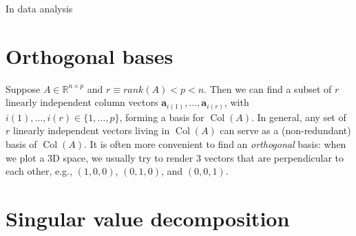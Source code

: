 \documentclass[
]{book}
\begin{document}
In data analysis

\section{Orthogonal bases}\label{orthogonal-bases}

Suppose \(A \in \mathbb{R}^{n \times p}\) and \(r \equiv rank(A) < p < n\). Then we can find a subset of \(r\) linearly independent column vectors \(\mathbf{a}_{i(1)}, \dots, \mathbf{a}_{i(r)}\), with \(i(1), \dots, i(r) \in \{1, \dots, p\}\), forming a basis for \(\operatorname{Col}(A)\). In general, any set of \(r\) linearly independent vectors living in \(\operatorname{Col}(A)\) can serve as a (non-redundant) basis of \(\operatorname{Col}(A)\). It is often more convenient to find an \emph{orthogonal} basis: when we plot a 3D space, we usually try to render 3 vectors that are perpendicular to each other, e.g., \((1,0,0)\), \((0,1,0)\), and \((0,0,1)\).

\section{Singular value decomposition}\label{singular-value-decomposition}
\end{document}
